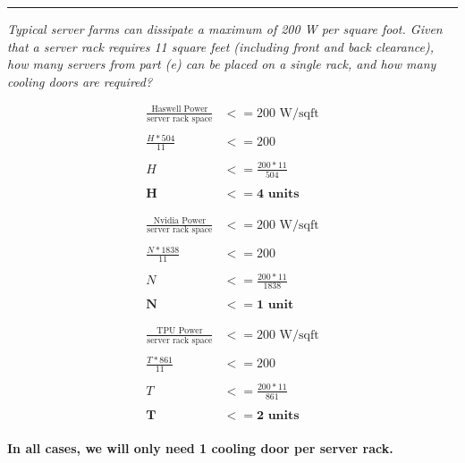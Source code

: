 \documentclass[11pt]{exam}
\newcounter{questionCounter}
\newcounter{partCounter}[questionCounter]
\newenvironment{namedquestion}[1]{%
    \addtocounter{questionCounter}{1}%
    \setcounter{partCounter}{0}%
    \vspace{.2in}%
        \noindent{\bf #1}%
    \vspace{0.3em} \hrule \vspace{.1in}%
}{}
\begin{document}
\begin{namedquestion}{Problem 1.6F}
\textit{Typical server farms can dissipate a maximum of 200 W per square foot. Given that a server rack requires 11 square feet (including front and back clearance), how many servers from part (e) can be placed on a single rack, and how many cooling doors are required?}

\begin{equation}
    \begin{split}
        \frac{\text{Haswell Power}}{\text{server rack space}} & <= \text{200 W/sqft}\\
        \\
        \frac{H * 504}{11} & <= 200\\
        \\
        H & <= \frac{200*11}{504}\\
        \\
        \textbf{H} & <= \textbf{4 units}
    \end{split}
\end{equation}

\begin{equation}
    \begin{split}
        \frac{\text{Nvidia Power}}{\text{server rack space}} & <= \text{200 W/sqft}\\
        \\
        \frac{N * 1838}{11} & <= 200\\
        \\
        N & <= \frac{200*11}{1838}\\
        \\
        \textbf{N} & <= \textbf{1 unit}
    \end{split}
\end{equation}

\begin{equation}
    \begin{split}
        \frac{\text{TPU Power}}{\text{server rack space}} & <= \text{200 W/sqft}\\
        \\
        \frac{T * 861}{11} & <= 200\\
        \\
        T & <= \frac{200*11}{861}\\
        \\
        \textbf{T} & <= \textbf{2 units}
    \end{split}
\end{equation}
\\

\textbf{In all cases, we will only need 1 cooling door per server rack.}


\end{namedquestion}


\printbibliography
\end{document}
